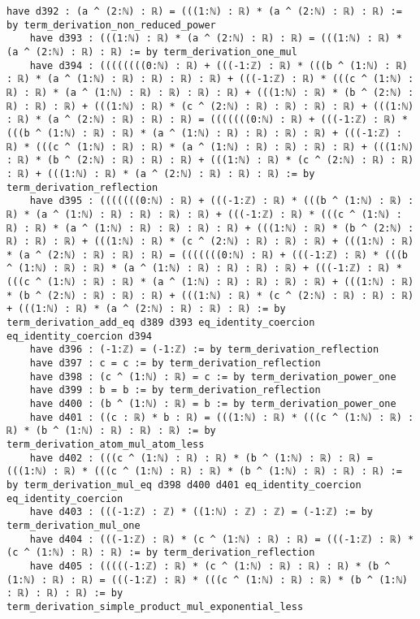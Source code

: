 \documentclass{article}
\begin{document}
\begin{tcolorbox}[colback=white!10, width=\linewidth]
\begin{lstlisting}[language=Lean4]
    have d392 : (a ^ (2:ℕ) : ℝ) = (((1:ℕ) : ℝ) * (a ^ (2:ℕ) : ℝ) : ℝ) := by term_derivation_non_reduced_power
    have d393 : (((1:ℕ) : ℝ) * (a ^ (2:ℕ) : ℝ) : ℝ) = (((1:ℕ) : ℝ) * (a ^ (2:ℕ) : ℝ) : ℝ) := by term_derivation_one_mul
    have d394 : ((((((((0:ℕ) : ℝ) + (((-1:ℤ) : ℝ) * (((b ^ (1:ℕ) : ℝ) : ℝ) * (a ^ (1:ℕ) : ℝ) : ℝ) : ℝ) : ℝ) + (((-1:ℤ) : ℝ) * (((c ^ (1:ℕ) : ℝ) : ℝ) * (a ^ (1:ℕ) : ℝ) : ℝ) : ℝ) : ℝ) + (((1:ℕ) : ℝ) * (b ^ (2:ℕ) : ℝ) : ℝ) : ℝ) + (((1:ℕ) : ℝ) * (c ^ (2:ℕ) : ℝ) : ℝ) : ℝ) : ℝ) + (((1:ℕ) : ℝ) * (a ^ (2:ℕ) : ℝ) : ℝ) : ℝ) = (((((((0:ℕ) : ℝ) + (((-1:ℤ) : ℝ) * (((b ^ (1:ℕ) : ℝ) : ℝ) * (a ^ (1:ℕ) : ℝ) : ℝ) : ℝ) : ℝ) + (((-1:ℤ) : ℝ) * (((c ^ (1:ℕ) : ℝ) : ℝ) * (a ^ (1:ℕ) : ℝ) : ℝ) : ℝ) : ℝ) + (((1:ℕ) : ℝ) * (b ^ (2:ℕ) : ℝ) : ℝ) : ℝ) + (((1:ℕ) : ℝ) * (c ^ (2:ℕ) : ℝ) : ℝ) : ℝ) + (((1:ℕ) : ℝ) * (a ^ (2:ℕ) : ℝ) : ℝ) : ℝ) := by term_derivation_reflection
    have d395 : (((((((0:ℕ) : ℝ) + (((-1:ℤ) : ℝ) * (((b ^ (1:ℕ) : ℝ) : ℝ) * (a ^ (1:ℕ) : ℝ) : ℝ) : ℝ) : ℝ) + (((-1:ℤ) : ℝ) * (((c ^ (1:ℕ) : ℝ) : ℝ) * (a ^ (1:ℕ) : ℝ) : ℝ) : ℝ) : ℝ) + (((1:ℕ) : ℝ) * (b ^ (2:ℕ) : ℝ) : ℝ) : ℝ) + (((1:ℕ) : ℝ) * (c ^ (2:ℕ) : ℝ) : ℝ) : ℝ) + (((1:ℕ) : ℝ) * (a ^ (2:ℕ) : ℝ) : ℝ) : ℝ) = (((((((0:ℕ) : ℝ) + (((-1:ℤ) : ℝ) * (((b ^ (1:ℕ) : ℝ) : ℝ) * (a ^ (1:ℕ) : ℝ) : ℝ) : ℝ) : ℝ) + (((-1:ℤ) : ℝ) * (((c ^ (1:ℕ) : ℝ) : ℝ) * (a ^ (1:ℕ) : ℝ) : ℝ) : ℝ) : ℝ) + (((1:ℕ) : ℝ) * (b ^ (2:ℕ) : ℝ) : ℝ) : ℝ) + (((1:ℕ) : ℝ) * (c ^ (2:ℕ) : ℝ) : ℝ) : ℝ) + (((1:ℕ) : ℝ) * (a ^ (2:ℕ) : ℝ) : ℝ) : ℝ) := by term_derivation_add_eq d389 d393 eq_identity_coercion eq_identity_coercion d394
    have d396 : (-1:ℤ) = (-1:ℤ) := by term_derivation_reflection
    have d397 : c = c := by term_derivation_reflection
    have d398 : (c ^ (1:ℕ) : ℝ) = c := by term_derivation_power_one
    have d399 : b = b := by term_derivation_reflection
    have d400 : (b ^ (1:ℕ) : ℝ) = b := by term_derivation_power_one
    have d401 : ((c : ℝ) * b : ℝ) = (((1:ℕ) : ℝ) * (((c ^ (1:ℕ) : ℝ) : ℝ) * (b ^ (1:ℕ) : ℝ) : ℝ) : ℝ) := by term_derivation_atom_mul_atom_less
    have d402 : (((c ^ (1:ℕ) : ℝ) : ℝ) * (b ^ (1:ℕ) : ℝ) : ℝ) = (((1:ℕ) : ℝ) * (((c ^ (1:ℕ) : ℝ) : ℝ) * (b ^ (1:ℕ) : ℝ) : ℝ) : ℝ) := by term_derivation_mul_eq d398 d400 d401 eq_identity_coercion eq_identity_coercion
    have d403 : (((-1:ℤ) : ℤ) * ((1:ℕ) : ℤ) : ℤ) = (-1:ℤ) := by term_derivation_mul_one
    have d404 : (((-1:ℤ) : ℝ) * (c ^ (1:ℕ) : ℝ) : ℝ) = (((-1:ℤ) : ℝ) * (c ^ (1:ℕ) : ℝ) : ℝ) := by term_derivation_reflection
    have d405 : (((((-1:ℤ) : ℝ) * (c ^ (1:ℕ) : ℝ) : ℝ) : ℝ) * (b ^ (1:ℕ) : ℝ) : ℝ) = (((-1:ℤ) : ℝ) * (((c ^ (1:ℕ) : ℝ) : ℝ) * (b ^ (1:ℕ) : ℝ) : ℝ) : ℝ) := by term_derivation_simple_product_mul_exponential_less

\end{lstlisting}
\end{tcolorbox}
\end{document}
